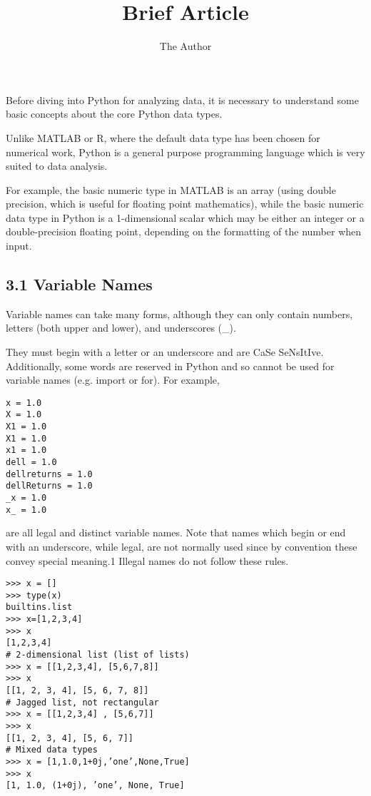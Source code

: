 \documentclass[11pt]{article} %
\title{Brief Article}
\author{The Author}
\begin{document}
Before diving into Python for analyzing data, it is necessary to 
understand some basic concepts about the core Python data types.

 Unlike MATLAB or R, where the default data type has been chosen for numerical work, Python is 
 a general purpose programming language which is very suited to data analysis.

For example,
the basic numeric type in MATLAB is an array (using double precision, which is useful for floating point
mathematics), while the basic numeric data type in Python is a 1-dimensional scalar which may be either
an integer or a double-precision floating point, depending on the formatting of the number when input.


\subsection{3.1 Variable Names}
Variable names can take many forms, although they can only contain numbers, letters (both upper and
lower), and underscores (\_). 

They must begin with a letter or an underscore and are CaSe SeNsItIve.
Additionally, some words are reserved in Python and so cannot be used for variable names (e.g. import or for). For example,

\begin{framed}
\begin{verbatim}
x = 1.0
X = 1.0
X1 = 1.0
X1 = 1.0
x1 = 1.0
dell = 1.0
dellreturns = 1.0
dellReturns = 1.0
_x = 1.0
x_ = 1.0
\end{verbatim}
\end{framed}

are all legal and distinct variable names. Note that names which begin or end with an underscore, while
legal, are not normally used since by convention these convey special meaning.1 Illegal names do not
follow these rules.
\newpage

\begin{framed}
\begin{verbatim}
>>> x = []
>>> type(x)
builtins.list
>>> x=[1,2,3,4]
>>> x
[1,2,3,4]
# 2-dimensional list (list of lists)
>>> x = [[1,2,3,4], [5,6,7,8]]
>>> x
[[1, 2, 3, 4], [5, 6, 7, 8]]
# Jagged list, not rectangular
>>> x = [[1,2,3,4] , [5,6,7]]
>>> x
[[1, 2, 3, 4], [5, 6, 7]]
# Mixed data types
>>> x = [1,1.0,1+0j,’one’,None,True]
>>> x
[1, 1.0, (1+0j), ’one’, None, True]

\end{verbatim}
\end{framed}
\end{document}
